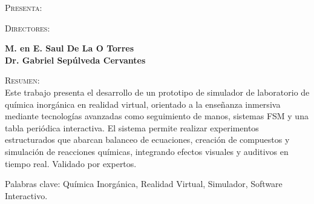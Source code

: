     \vspace{40pt}
    {\fontsize{14}{14}\selectfont\textsc{Presenta:\\}}
    \vspace{10pt}
    {\fontsize{14}{14}\selectfont\textbf{}}

    \vspace{40pt}
    {\fontsize{14}{14}\selectfont\textsc{Directores:\\}}
    \begin{multicols}{2}
        {\fontsize{14}{14}\selectfont\textbf{M. en E. Saul De La O Torres}\\}
        {\fontsize{14}{14}\selectfont\textbf{Dr. Gabriel Sepúlveda Cervantes}}
    \end{multicols}

    \vspace{30pt}
    {\fontsize{14}{14}\selectfont\textsc{Resumen:\\}}
    \vspace{10pt}
    \justify
    {\fontsize{14}{14}\selectfont
    Este trabajo presenta el desarrollo de un prototipo de simulador de laboratorio de química inorgánica en realidad virtual, orientado a la enseñanza inmersiva mediante tecnologías avanzadas como seguimiento de manos, sistemas FSM y una tabla periódica interactiva. El sistema permite realizar experimentos estructurados que abarcan balanceo de ecuaciones, creación de compuestos y simulación de reacciones químicas, integrando efectos visuales y auditivos en tiempo real. Validado por expertos.}

    {\fontsize{14}{14}\selectfont Palabras clave: Química Inorgánica, Realidad Virtual, Simulador, Software Interactivo.\\}
    
    \vspace{20pt}
    \raggedright
    
